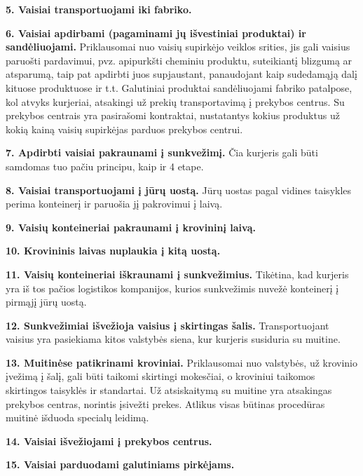 \medskip \noindent \textbf{5. Vaisiai transportuojami iki fabriko.}

\medskip \noindent \textbf{6. Vaisiai apdirbami (pagaminami jų išvestiniai produktai) ir sandėliuojami.} Priklausomai nuo vaisių supirkėjo veiklos srities, jis gali vaisius paruošti pardavimui, pvz. apipurkšti cheminiu produktu, suteikiantį blizgumą ar atsparumą, taip pat apdirbti juos supjaustant, panaudojant kaip sudedamąją dalį kituose produktuose ir t.t. Galutiniai produktai sandėliuojami fabriko patalpose, kol atvyks kurjeriai, atsakingi už prekių transportavimą į prekybos centrus. Su prekybos centrais yra pasirašomi kontraktai, nustatantys kokius produktus už kokią kainą vaisių supirkėjas parduos prekybos centrui.

\medskip \noindent \textbf{7. Apdirbti vaisiai pakraunami į sunkvežimį.} Čia kurjeris gali būti samdomas tuo pačiu principu, kaip ir 4 etape.

\medskip \noindent \textbf{8. Vaisiai transportuojami į jūrų uostą.} Jūrų uostas pagal vidines taisykles perima konteinerį ir paruošia jį pakrovimui į laivą.

\medskip \noindent \textbf{9. Vaisių konteineriai pakraunami į krovininį laivą.}

\medskip \noindent \textbf{10. Krovininis laivas nuplaukia į kitą uostą.}

\medskip \noindent \textbf{11. Vaisių konteineriai iškraunami į sunkvežimius.} Tikėtina, kad kurjeris yra iš tos pačios logistikos kompanijos, kurios sunkvežimis nuvežė konteinerį į pirmąjį jūrų uostą.

\medskip \noindent \textbf{12. Sunkvežimiai išvežioja vaisius į skirtingas šalis.} Transportuojant vaisius yra pasiekiama kitos valstybės siena, kur kurjeris susiduria su muitine.

\medskip \noindent \textbf{13. Muitinėse patikrinami kroviniai.} Priklausomai nuo valstybės, už krovinio įvežimą į šalį, gali būti taikomi skirtingi mokesčiai, o kroviniui taikomos skirtingos taisyklės ir standartai. Už atsiskaitymą su muitine yra atsakingas prekybos centras, norintis įsivežti prekes. Atlikus visas būtinas procedūras muitinė išduoda specialų leidimą.

\medskip \noindent \textbf{14. Vaisiai išvežiojami į prekybos centrus.}

\medskip \noindent \textbf{15. Vaisiai parduodami galutiniams pirkėjams.}




